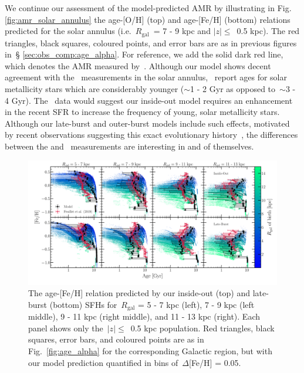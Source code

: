 \documentclass[fleqn, usenatbib]{mnras}
\begin{document}
We continue our assessment of the model-predicted AMR by illustrating in Fig. 
\ref{fig:amr_solar_annulus} the age-[O/H] (top) and age-[Fe/H] (bottom) 
relations predicted for the solar annulus (i.e.~$R_\text{gal}$~= 7 - 9 kpc and 
$\left|z\right|\leq$~0.5 kpc). The red triangles, black squares, coloured 
points, and error bars are as in previous figures in~\S 
\ref{sec:obs_comp:age_alpha}. For reference, we add the solid dark red line, 
which denotes the AMR measured by~\citet{Feuillet2018}. Although our model 
shows decent agreement with the~\citet{Feuillet2019} measurements in the solar 
annulus,~\citet{Feuillet2018} report ages for solar metallicity stars which 
are considerably younger ($\sim$1 - 2 Gyr as opposed to~$\sim$3 - 4 Gyr). 
The~\citet{Feuillet2018} data would suggest our inside-out model requires an 
enhancement in the recent SFR to increase the frequency of young, solar 
metallicity stars. Although our late-burst and outer-burst models include 
such effects, motivated by recent observations suggesting this exact 
evolutionary history~\citep{Mor2019, Isern2019}, the differences between the 
\citet{Feuillet2018} and~\citet{Feuillet2019} measurements are interesting in 
and of themselves. 

\begin{figure} 
\centering 
\includegraphics[scale = 0.35]{amr_insideout_vs_lateburst_fe.pdf} 
\caption{The age-[Fe/H] relation predicted by our inside-out (top) and 
late-burst (bottom) SFHs for~$R_\text{gal}$ = 5 - 7 kpc (left), 7 - 9 kpc 
(left middle), 9 - 11 kpc (right middle), and 11 - 13 kpc (right). Each panel 
shows only the~$\left|z\right|\leq$~0.5 kpc population. Red triangles, black 
squares, error bars, and coloured points are as in Fig.~\ref{fig:age_alpha} for 
the corresponding Galactic region, but with our model prediction quantified in 
bins of~$\Delta$[Fe/H] = 0.05. } 
\label{fig:amr_insideout_vs_lateburst_fe} 
\end{figure} 
\end{document}

